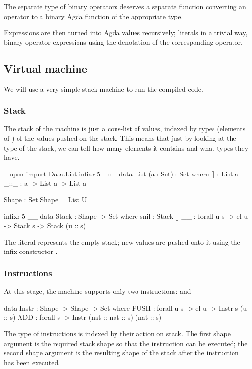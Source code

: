 \noindent The separate type of binary operators deserves a separate function
converting an operator to a binary Agda function of the appropriate type.

Expressions are then turned into Agda values recursively; literals in a trivial
way, binary-operator expressions using the denotation of the corresponding
operator.

\subsection{Virtual machine}

We will use a very simple stack machine to run the compiled code.

\subsubsection{Stack}

The stack of
the machine is just a cons-list of values, indexed by types (elements of
) of the values pushed on the stack.  This means that just by looking
at the type of the stack, we can tell how many elements it contains and what
types they have.
\begin{code}
  -- open import Data.List
  infixr 5 _::_
  data List (a : Set) : Set where
    [] : List a
    _::_ : a -> List a -> List a

  Shape : Set
  Shape = List U

  infixr 5 _\scons\_
  data Stack : Shape -> Set where
    snil : Stack []
    _\scons\_ : forall {u s} -> el u -> Stack s -> Stack (u :: s)
\end{code}
\noindent The literal  represents the empty stack; new values are
pushed onto it using the infix constructor \ident{\bin{\scons}}.

\subsubsection{Instructions}

At this stage, the machine supports only two instructions: 
and .
\begin{code}
  data Instr : Shape -> Shape -> Set where
    PUSH : forall {u s} -> el u -> Instr s (u :: s)
    ADD : forall s -> Instr (nat :: nat :: s) (nat :: s)
\end{code}
The type of instructions is indexed by their action on stack. The first shape
argument is the required stack shape so that the instruction can be executed;
the second shape argument is the resulting shape of the stack after the
instruction has been executed.

